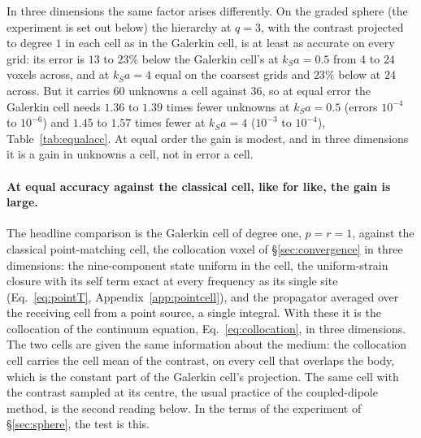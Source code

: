 \documentclass[11pt,a4paper]{article}
\begin{document}
In three dimensions the same factor arises differently. On the graded sphere (the experiment is set out
below) the hierarchy at $q=3$, with the contrast projected to degree $1$ in each cell as in the Galerkin
cell, is at least as accurate on every grid: its error is $13$ to $23\%$ below the Galerkin cell's at
$k_Sa=0.5$ from $4$ to $24$ voxels across, and at $k_Sa=4$ equal on the coarsest grids and $23\%$ below at
$24$ across. But it carries $60$ unknowns a cell against $36$, so at equal error the Galerkin cell needs
$1.36$ to $1.39$ times fewer unknowns at $k_Sa=0.5$ (errors $10^{-4}$ to $10^{-6}$) and $1.45$ to
$1.57$ times fewer at $k_Sa=4$ ($10^{-3}$ to $10^{-4}$), Table~\ref{tab:equalacc}. At equal order the
gain is modest, and in three dimensions it is a gain in unknowns a cell, not in error a cell.

\paragraph{At equal accuracy against the classical cell, like for like, the gain is large.} The headline
comparison is the Galerkin cell of degree one, $p=r=1$, against the classical point-matching cell, the
collocation voxel of \S\ref{sec:convergence} in three dimensions: the nine-component state uniform in the
cell, the uniform-strain closure with its self term exact at every frequency as its single site
(Eq.~\eqref{eq:pointT}, Appendix~\ref{app:pointcell}), and the propagator averaged over the receiving cell
from a point source, a single integral. With these it is the collocation of the continuum equation,
Eq.~\eqref{eq:collocation}, in three dimensions. The two cells are given the same information about the
medium: the collocation cell carries the cell mean of the contrast, on every cell that overlaps the body,
which is the constant part of the Galerkin cell's projection. The same cell with the contrast sampled at
its centre, the usual practice of the coupled-dipole method, is the second reading below. In the terms of
the experiment of \S\ref{sec:sphere}, the test is this.
\end{document}

